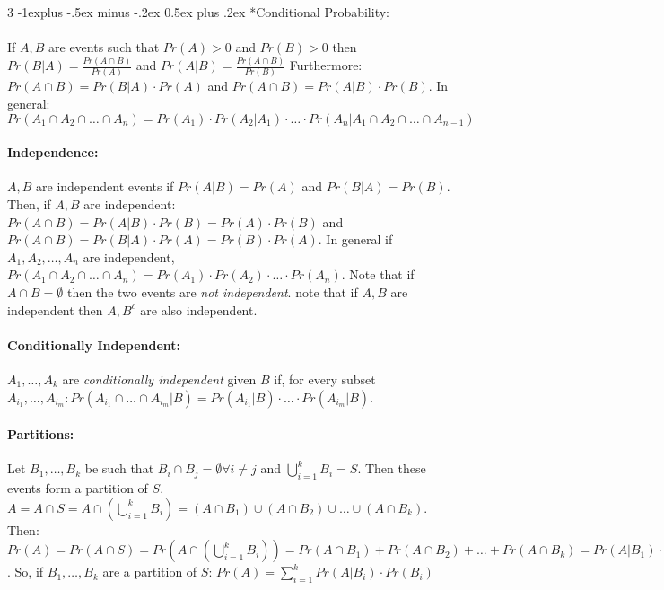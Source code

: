 \documentclass[landscape,10pt]{article}
\makeatletter
\renewcommand{\subsection}{\@startsection{subsection}{2}{0mm}%
                                {-1explus -.5ex minus -.2ex}%
                                {0.5ex plus .2ex}%
                                {\normalfont\normalsize\bfseries}}
\makeatother
\begin{document}
\begin{multicols}{3}
    \subsection*{Conditional Probability: }
        \paragraph*{}
            If $A, B$ are events such that $Pr(A) > 0$ and $Pr(B) > 0$ then $Pr(B|A) = \frac{Pr(A\cap B)}{Pr(A)}$ and 
            $Pr(A|B) = \frac{Pr(A \cap B)}{Pr(B)}$ 
            Furthermore: $Pr(A \cap B) = Pr(B|A) \cdot Pr(A)$ and $Pr(A \cap B) = Pr(A|B) \cdot Pr(B)$. In general: $Pr(A_1 \cap A_2 \cap \ldots \cap A_n) = Pr(A_1) \cdot Pr(A_2 | A_1) \cdot \ldots \cdot Pr(A_n | A_1 \cap A_2 \cap \ldots \cap A_{n-1})$
        \paragraph*{Independence:}
            $A, B$ are independent events if $Pr(A|B) = Pr(A)$ and $Pr(B|A) = Pr(B)$. Then, if $A, B$ are independent: $Pr(A \cap B) = Pr(A|B) \cdot Pr(B) = Pr(A) \cdot Pr(B)$ and $Pr(A \cap B) = Pr(B | A) \cdot Pr(A) = Pr(B) \cdot Pr(A)$. In general if $A_1, A_2, \ldots, A_n$ are independent, $Pr(A_1 \cap A_2 \cap \ldots \cap A_n) = Pr(A_1) \cdot Pr(A_2) \cdot \ldots \cdot Pr(A_n)$. Note that if $A \cap B = \emptyset$ then the two events are \textit{not independent}. note that if $A, B$ are independent then $A, B^c$ are also independent.
        
        \paragraph*{Conditionally Independent: } 
            $A_1, \ldots, A_k$ are \textit{conditionally independent} given $B$ if, for every subset $A_{i_1}, \ldots, A_{i_m}: Pr(A_{i_1} \cap \ldots \cap A_{i_m} | B) = Pr(A_{i_1} | B) \cdot \ldots \cdot Pr(A_{i_m} | B)$.
        
        \paragraph*{Partitions: }
            Let $B_1, \ldots, B_k$ be such that $B_i \cap B_j = \emptyset \forall i \neq j$ and $\bigcup\limits_{i = 1}^{k} B_i = S$. Then these events form a partition of $S$. \\
            $A = A \cap S = A \cap \left(\bigcup\limits_{i = 1}^{k} B_i\right) = (A \cap B_1) \cup (A \cap B_2) \cup \ldots \cup (A \cap B_k)$. Then: $Pr(A) = Pr(A \cap S) = Pr(A \cap \left(\bigcup\limits_{i = 1}^{k} B_i \right)) = Pr(A \cap B_1) + Pr(A \cap B_2) + \ldots + Pr(A \cap B_k) = Pr(A|B_1) \cdot Pr(B_1) + Pr(A|B_2)\cdot Pr(B_2) + \ldots + Pr(A|B_k) \cdot Pr(B_k) = \sum\limits_{i=1}^{k} Pr(A|B_i)\cdot Pr(B_i)$. So, if $B_1, \ldots, B_k$ are a partition of $S$: $Pr(A) = \sum\limits_{i=1}^{k}Pr(A|B_i)\cdot Pr(B_i)$
        

\end{multicols}
\end{document}
